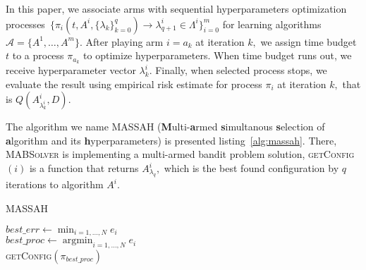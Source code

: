 \documentclass{svproc}
\DeclareMathOperator*{\argmin}{argmin}
\begin{document}
In this paper, we associate arms with sequential hyperparameters optimization processes~$\{\pi_i(t, A^i, \{\lambda_k\}^q_{k=0}) \rightarrow \lambda^i_{q+1} \in \Lambda^i\}_{i=0}^m$ for learning algorithms $\mathscr{A} = \{A^1, \dots, A^m\}$. After playing arm $i = a_k$ at iteration $k,$ we assign time budget $t$ to a process $\pi_{a_k}$ to optimize hyperparameters. When time budget runs out, we receive hyperparameter vector $\lambda^i_k$. Finally, when selected process stops, we evaluate the result using empirical risk estimate for process $\pi_i$ at iteration $k,$ that is $Q(A^i_{\lambda^i_k}, D)$.

The algorithm we name MASSAH (\textbf{M}ulti-\textbf{a}rmed \textbf{s}imultanous \textbf{s}election of \textbf{a}lgorithm and its \textbf{h}yperparameters) is presented listing~\ref{alg:massah}. There, \textsc{MABSolver} is implementing a multi-armed bandit problem solution, \textsc{getConfig}$(i)$ is a function that returns $A^i_{\lambda_q},$ which is the best found configuration by $q$ iterations to algorithm $A^i$.

\begin{algorithm}[t]
  \caption{MASSAH}\label{alg:massah}
    \BlankLine
    $best\_err \gets \min_{i=1,\ldots,N} e_i$\\
    $best\_proc \gets \argmin_{i=1,\ldots,N} e_i$\\
    \Return \textsc{getConfig}$(\pi_{best\_proc})$
\end{algorithm}
\end{document}
